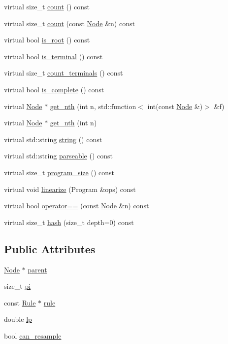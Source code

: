 \begin{DoxyCompactItemize}
\item 
virtual size\+\_\+t \hyperlink{class_node_abd387b27e1deb45b789ad7b7abd8c6e6}{count} () const
\item 
virtual size\+\_\+t \hyperlink{class_node_a0cc58478d98361566830a8d3db745718}{count} (const \hyperlink{class_node}{Node} \&n) const
\item 
virtual bool \hyperlink{class_node_ad12a96da2fe796616aa22e20429f41d5}{is\+\_\+root} () const
\item 
virtual bool \hyperlink{class_node_ac3c263a4e0c734c34aaf62f80f84cd9a}{is\+\_\+terminal} () const
\item 
virtual size\+\_\+t \hyperlink{class_node_a70c820eaeaa852e3c0a46cf006026c1b}{count\+\_\+terminals} () const
\item 
virtual bool \hyperlink{class_node_ac2e36754ba8b1b1d452deeb2bdbd346f}{is\+\_\+complete} () const
\item 
virtual \hyperlink{class_node}{Node} $\ast$ \hyperlink{class_node_a93fc84b584f080593978d3a39631d3e5}{get\+\_\+nth} (int n, std\+::function$<$ int(const \hyperlink{class_node}{Node} \&)$>$ \&f)
\item 
virtual \hyperlink{class_node}{Node} $\ast$ \hyperlink{class_node_a224c0ee6dae35ddce70f8fd3b91e0b1c}{get\+\_\+nth} (int n)
\item 
virtual std\+::string \hyperlink{class_node_a0590ae269543416be9c4ebdf70bad73b}{string} () const
\item 
virtual std\+::string \hyperlink{class_node_a70e879ceb71f47787137572d9bee8efa}{parseable} () const
\item 
virtual size\+\_\+t \hyperlink{class_node_a377548bcf1be99ac5181f9434c33c81e}{program\+\_\+size} () const
\item 
virtual void \hyperlink{class_node_ac995508e96e112675fde53e7748e41bc}{linearize} (Program \&ops) const
\item 
virtual bool \hyperlink{class_node_a90aeee00ccda27f36bea9cdd774eae8d}{operator==} (const \hyperlink{class_node}{Node} \&n) const
\item 
virtual size\+\_\+t \hyperlink{class_node_a212f2e1ba4ff71de6954b0b791d89979}{hash} (size\+\_\+t depth=0) const
\end{DoxyCompactItemize}
\subsection*{Public Attributes}
\begin{DoxyCompactItemize}
\item 
\hyperlink{class_node}{Node} $\ast$ \hyperlink{class_node_ad8184598cdea70e4bbdfd76f2b0f9e85}{parent}
\item 
size\+\_\+t \hyperlink{class_node_ad8e140a5af4e5c312141f2b7af255520}{pi}
\item 
const \hyperlink{class_rule}{Rule} $\ast$ \hyperlink{class_node_a02f5c9463cceb270ad5730760f19c722}{rule}
\item 
double \hyperlink{class_node_a298eaa3743b774a3f9ef396e1dc42a08}{lp}
\item 
bool \hyperlink{class_node_a98c14a51b240fbc7e438f40a12276257}{can\+\_\+resample}
\end{DoxyCompactItemize}
